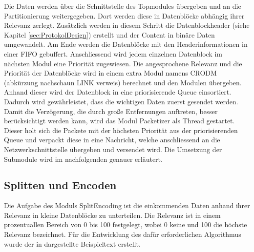 Die Daten werden über die Schnittstelle des Topmodules übergeben und an die
Partitionierung weitergegeben. Dort werden diese in Datenblöcke
abhängig ihrer Relevanz zerlegt. Zusätzlich werden in diesem Schritt die
Datenblockheader (siehe Kapitel \ref{sec:ProtokolDesign}) erstellt und der
Content in binäre Daten umgewandelt. Am Ende werden die Datenblöcke mit den
Headerinformationen in einer FIFO gebuffert. Anschliessend wird jedem einzelnen
Datenblock im nächsten Modul eine Priorität zugewiesen. Die angesprochene
Relevanz und die Priorität der Datenblöcke wird in einem extra Modul namens
CRODM (abkürzung nachschaun LINK verweis) berechnet und den Modulen übergeben.
Anhand dieser wird der Datenblock in eine priorisierende Queue einsortiert.
Dadurch wird gewährleistet, dass die wichtigen Daten zuerst gesendet werden.
Damit die Verzögerung, die durch große Entfernungen auftreten, besser
berücksichtigt werden kann, wird das Modul Packetizer als Thread gestartet.
Dieser holt sich die Packete mit der höchsten Priorität aus der priorisierenden Queue
und verpackt diese in eine Nachricht, welche anschliessend an die
Netzwerkschnittstelle übergeben und versendet wird. \newline
% 
% 
Die Umsetzung der Submodule wird im nachfolgenden genauer erläutert.

\subsection{Splitten und Encoden}

Die Aufgabe des Moduls SplitEncoding ist die einkommenden Daten
anhand ihrer Relevanz in kleine Datenblöcke zu unterteilen. Die Relevanz ist
in einem prozentuallen Bereich von 0 bis 100 festgelegt, wobei 0 keine und 100
die höchste Relevanz bezeichnet. Für die Entwicklung des dafür erforderlichen
Algorithmus wurde der in  dargestellte Beispieltext
erstellt.

